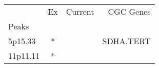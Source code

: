 \begin{tabular}{lccr}
\toprule
{} & Ex & Current &  CGC Genes \\
Peaks    &    &         &            \\
\midrule
5p15.33  &  * &         &  SDHA,TERT \\
11p11.11 &  * &         &            \\
\bottomrule
\end{tabular}
